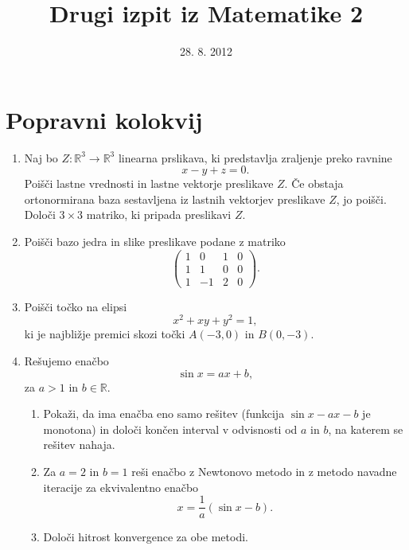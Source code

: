 \documentclass[a4paper,10pt]{article}
\title{Drugi izpit iz Matematike 2}
\date{28. 8. 2012}
\begin{document}
\maketitle

\section*{Popravni kolokvij}
\begin{enumerate}
\item Naj bo $Z:\mathbb{R}^{3}\to\mathbb{R}^{3}$ linearna prslikava, ki
predstavlja zraljenje preko ravnine
\[
x-y+z=0.
\]
Poišči lastne vrednosti in lastne vektorje preslikave $Z$. Če obstaja
ortonormirana baza sestavljena iz lastnih vektorjev preslikave $Z$,
jo poišči. Določi $3\times3$ matriko, ki pripada preslikavi $Z$.
\item Poišči bazo jedra in slike preslikave podane z matriko
\[
\begin{pmatrix}1 & 0 & 1 & 0\\
1 & 1 & 0 & 0\\
1 & -1 & 2 & 0
\end{pmatrix}.
\]

\item Poišči točko na elipsi
\[
x^{2}+xy+y^{2}=1,
\]
ki je najbližje premici skozi točki $A(-3,0)$ in $B(0,-3)$.
\item Rešujemo enačbo
\[
\sin x=ax+b,
\]
za $a>1$ in $b\in\mathbb{R}$.

\begin{enumerate}
\item Pokaži, da ima enačba eno samo rešitev (funkcija $\sin x-ax-b$ je
monotona) in določi končen interval v odvisnosti od $a$ in $b$,
na katerem se rešitev nahaja.
\item Za $a=2$ in $b=1$ reši enačbo z Newtonovo metodo in z metodo navadne
iteracije za ekvivalentno enačbo
\[
x=\frac{1}{a}(\sin x-b).
\]

\item Določi hitrost konvergence za obe metodi.
\end{enumerate}


\end{enumerate}
\newpage
\end{document}

